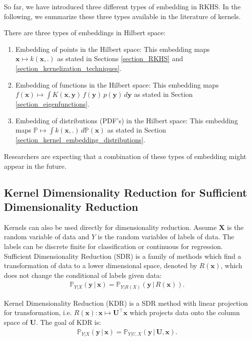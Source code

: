 \documentclass[lang=cn,10pt]{gorgeousnbook}
\numberwithin{equation}{section}%
\numberwithin{figure}{section}%
\begin{document}
So far, we have introduced three different types of embedding in RKHS. In the following, we summarize these three types available in the literature of kernels. 
\begin{remark}
There are three types of embeddings in Hilbert space:
\begin{enumerate}[topsep=0pt,itemsep=-1ex,partopsep=1ex,parsep=1ex]
\item Embedding of points in the Hilbert space: This embedding maps $\boldsymbol{x} \mapsto k(\boldsymbol{x},.)$ as stated in Sections \ref{section_RKHS} and \ref{section_kernelization_techniques}. 
\item Embedding of functions in the Hilbert space: This embedding maps $f(\boldsymbol{x}) \mapsto \int K(\boldsymbol{x},\boldsymbol{y})\, f(\boldsymbol{y})\, p(\boldsymbol{y})\, d\boldsymbol{y}$ as stated in Section \ref{section_eigenfunctions}.
\item Embedding of distributions (PDF's) in the Hilbert space: This embedding maps $\mathbb{P} \mapsto \int k(\boldsymbol{x}, .)\, d\mathbb{P}(\boldsymbol{x})$ as stated in Section \ref{section_kernel_embedding_distributions}.
\end{enumerate}
Researchers are expecting that a combination of these types of embedding might appear in the future. 
\end{remark}


\subsection{Kernel Dimensionality Reduction for Sufficient Dimensionality Reduction}

Kernels can also be used directly for dimensionality reduction.
Assume $\boldsymbol{X}$ is the random variable of data and $Y$ is the random variables of labels of data. The labels can be discrete finite for classification or continuous for regression. 
Sufficient Dimensionality Reduction (SDR) \cite{adragni2009sufficient} is a family of methods which find a transformation of data to a lower dimensional space, denoted by $R(\boldsymbol{x})$, which does not change the conditional of labels given data:
\begin{align}
\mathbb{P}_{Y | X}(\boldsymbol{y}\, |\, \boldsymbol{x}) = \mathbb{P}_{Y | R(X)}(\boldsymbol{y}\, |\, R(\boldsymbol{x})).
\end{align}

Kernel Dimensionality Reduction (KDR) \cite{fukumizu2004dimensionality,fukumizu2009kernel,wang2010unsupervised} is a SDR method with linear projection for transformation, i.e. $R(\boldsymbol{x}): \boldsymbol{x} \mapsto \boldsymbol{U}^\top \boldsymbol{x}$ which projects data onto the column space of $\boldsymbol{U}$. The goal of KDR is:
\begin{align}
\mathbb{P}_{Y | X}(\boldsymbol{y}\, |\, \boldsymbol{x}) = \mathbb{P}_{Y | U, X}(\boldsymbol{y}\, |\, \boldsymbol{U}, \boldsymbol{x}).
\end{align}
\end{document}
